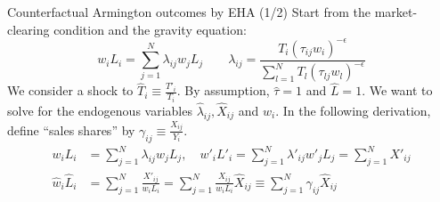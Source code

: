 \documentclass[10pt,notes=hide,aspectratio=169]{beamer}
\begin{document}
\begin{frame}{Counterfactual Armington outcomes by EHA (1/2)}
Start from the market-clearing condition and the gravity equation:
\begin{equation*}
w_i L_i
=
\sum_{j=1}^{N} \lambda_{ij} w_j L_j 
\quad \quad
\lambda_{ij} 
=
\frac{T_{i} \left(\tau_{ij}w_i\right)^{-\epsilon}}{\sum_{l=1}^{N} T_{l}  \left(\tau_{lj}w_l\right)^{-\epsilon}}
\end{equation*}
We consider a shock to $\hat{T}_{i} \equiv \frac{T'_{i}}{T_{i}}$.
By assumption, $\hat{\tau}=1$ and $\hat{L}=1$.
We want to solve for the endogenous variables $\hat{\lambda}_{ij}, \hat{X}_{ij}$ and $\hat{w}_{i}$.
In the following derivation, 
define ``sales shares'' by
$\gamma_{ij}\equiv\frac{X_{ij}}{Y_{i}}$.
\begin{align}
w_i L_i
&=
\sum_{j=1}^{N} \lambda_{ij} w_j L_j,
\quad
w'_i L'_i
=
\sum_{j=1}^{N} \lambda'_{ij} w'_j L_j
=
\sum_{j=1}^{N} X'_{ij}
\nonumber \\
\hat{w}_i \hat{L}_i
&= 
\sum_{j=1}^{N} \frac{X'_{ij}}{w_i L_i}
=
\sum_{j=1}^{N} \frac{X_{ij}}{w_i L_i} \hat{X}_{ij}
\equiv
\sum_{j=1}^{N} \gamma_{ij} \hat{X}_{ij}  \label{eqn:20180428:1sector:hatincome}
\end{align}
\end{frame}
\end{document}
